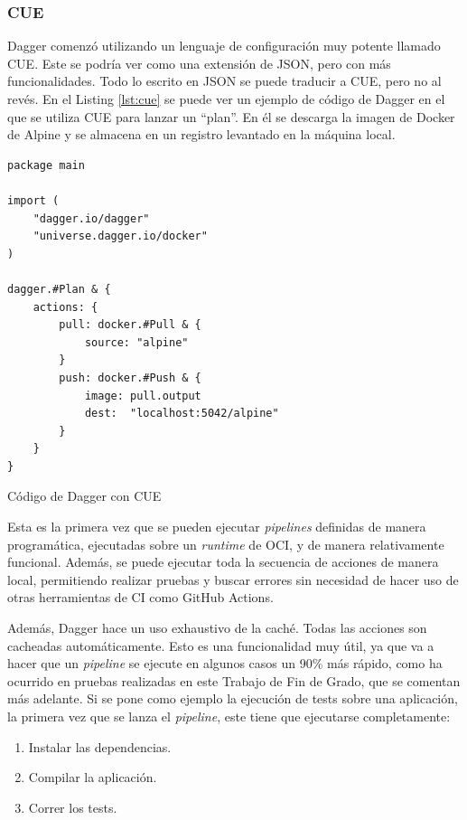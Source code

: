 \subsubsection*{CUE}
\label{subsec:cue}

Dagger comenzó utilizando un lenguaje de configuración muy potente llamado CUE\cite{cue}. Este se podría ver como una extensión de JSON, pero con más funcionalidades. Todo lo escrito en JSON se puede traducir a CUE, pero no al revés. En el Listing \ref{lst:cue} se puede ver un ejemplo de código de Dagger en el que se utiliza CUE para lanzar un ``plan''. En él se descarga la imagen de Docker de Alpine y se almacena en un registro levantado en la máquina local.

\begin{listing}[!ht]
  \begin{verbatim}
package main

import (
    "dagger.io/dagger"
    "universe.dagger.io/docker"
)

dagger.#Plan & {
    actions: {
        pull: docker.#Pull & {
            source: "alpine"
        }
        push: docker.#Push & {
            image: pull.output
            dest:  "localhost:5042/alpine"
        }
    }
}
  \end{verbatim}
  \caption{Código de Dagger con CUE}
  \label{lst:cue}
\end{listing}

Esta es la primera vez que se pueden ejecutar \textit{pipelines} definidas de manera programática, ejecutadas sobre un \textit{runtime} de OCI, y de manera relativamente funcional. Además, se puede ejecutar toda la secuencia de acciones de manera local, permitiendo realizar pruebas y buscar errores sin necesidad de hacer uso de otras herramientas de CI como GitHub Actions\cite{github-actions}.

Además, Dagger hace un uso exhaustivo de la caché. Todas las acciones son cacheadas automáticamente. Esto es una funcionalidad muy útil, ya que va a hacer que un \textit{pipeline} se ejecute en algunos casos un 90\% más rápido, como ha ocurrido en pruebas realizadas en este Trabajo de Fin de Grado, que se comentan más adelante. Si se pone como ejemplo la ejecución de tests sobre una aplicación, la primera vez que se lanza el \textit{pipeline}, este tiene que ejecutarse completamente:

\begin{enumerate}
  \item Instalar las dependencias.
  \item Compilar la aplicación.
  \item Correr los tests.
\end{enumerate}

